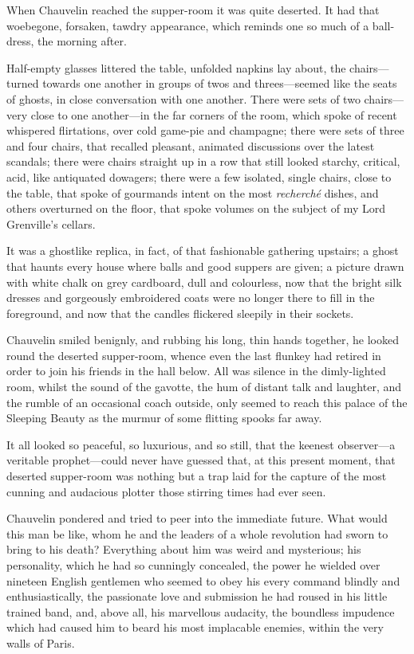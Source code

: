 \documentclass[paper=5.5in:8.5in,BCOR=7mm,twoside,DIV=calc,12pt,usegeometry,chapterprefix,endperiod,headings=big]{scrbook}
\begin{document}
When Chauvelin reached the supper-room it was quite deserted. It had that woebegone, forsaken, tawdry appearance, which reminds one so much of a ball-dress, the morning after.

Half-empty glasses littered the table, unfolded napkins lay about, the chairs---turned towards one another in groups of twos and threes---seemed like the seats of ghosts, in close conversation with one another. There were sets of two chairs---very close to one another---in the far corners of the room, which spoke of recent whispered flirtations, over cold game-pie and champagne; there were sets of three and four chairs, that recalled pleasant, animated discussions over the latest scandals; there were chairs straight up in a row that still looked starchy, critical, acid, like antiquated dowagers; there were a few isolated, single chairs, close to the table, that spoke of gourmands intent on the most \textit{recherché} dishes, and others overturned on the floor, that spoke volumes on the subject of my Lord Grenville's cellars.

It was a ghostlike replica, in fact, of that fashionable gathering upstairs; a ghost that haunts every house where balls and good suppers are given; a picture drawn with white chalk on grey cardboard, dull and colourless, now that the bright silk dresses and gorgeously embroidered coats were no longer there to fill in the foreground, and now that the candles flickered sleepily in their sockets.

Chauvelin smiled benignly, and rubbing his long, thin hands together, he looked round the deserted supper-room, whence even the last flunkey had retired in order to join his friends in the hall below. All was silence in the dimly-lighted room, whilst the sound of the gavotte, the hum of distant talk and laughter, and the rumble of an occasional coach outside, only seemed to reach this palace of the Sleeping Beauty as the murmur of some flitting spooks far away.

It all looked so peaceful, so luxurious, and so still, that the keenest observer---a veritable prophet---could never have guessed that, at this present moment, that deserted supper-room was nothing but a trap laid for the capture of the most cunning and audacious plotter those stirring times had ever seen.

Chauvelin pondered and tried to peer into the immediate future. What would this man be like, whom he and the leaders of a whole revolution had sworn to bring to his death? Everything about him was weird and mysterious; his personality, which he had so cunningly concealed, the power he wielded over nineteen English gentlemen who seemed to obey his every command blindly and enthusiastically, the passionate love and submission he had roused in his little trained band, and, above all, his marvellous audacity, the boundless impudence which had caused him to beard his most implacable enemies, within the very walls of Paris.
\end{document}
